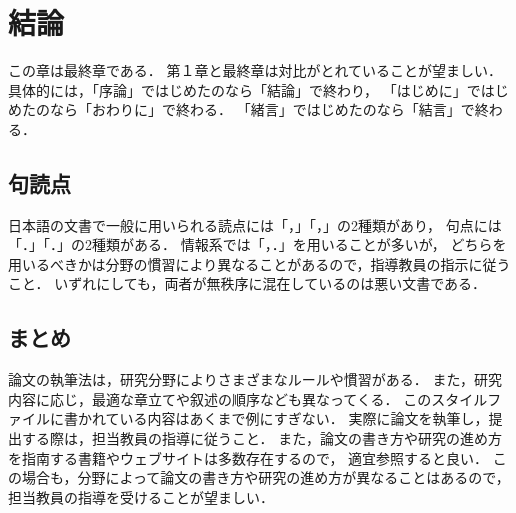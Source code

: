 \chapter{結論}	%

この章は最終章である．
第１章と最終章は対比がとれていることが望ましい．
具体的には，「序論」ではじめたのなら「結論」で終わり，
「はじめに」ではじめたのなら「おわりに」で終わる．
「緒言」ではじめたのなら「結言」で終わる．

\section{句読点}
日本語の文書で一般に用いられる読点には「，」「，」の2種類があり，
句点には「．」「．」の2種類がある．
情報系では「，．」を用いることが多いが，
どちらを用いるべきかは分野の慣習により異なることがあるので，指導教員の指示に従うこと．
いずれにしても，両者が無秩序に混在しているのは悪い文書である．

\section{まとめ}
論文の執筆法は，研究分野によりさまざまなルールや慣習がある．
また，研究内容に応じ，最適な章立てや叙述の順序なども異なってくる．
このスタイルファイルに書かれている内容はあくまで例にすぎない．
実際に論文を執筆し，提出する際は，担当教員の指導に従うこと．
また，論文の書き方や研究の進め方を指南する書籍やウェブサイトは多数存在するので，
適宜参照すると良い．
この場合も，分野によって論文の書き方や研究の進め方が異なることはあるので，
担当教員の指導を受けることが望ましい．
